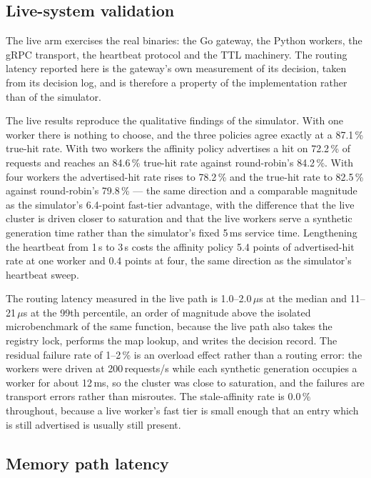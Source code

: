 \documentclass[10pt,twocolumn]{article}
\begin{document}
\subsection{Live-system validation}



The live arm exercises the real binaries: the Go gateway, the Python workers,
the gRPC transport, the heartbeat protocol and the TTL machinery. The routing
latency reported here is the gateway's own measurement of its decision, taken
from its decision log, and is therefore a property of the implementation
rather than of the simulator.

The live results reproduce the qualitative findings of the simulator. With one
worker there is nothing to choose, and the three policies agree exactly at a
87.1\,\% true-hit rate. With two workers the affinity policy advertises a hit
on 72.2\,\% of requests and reaches an 84.6\,\% true-hit rate against
round-robin's 84.2\,\%. With four workers the advertised-hit rate rises to
78.2\,\% and the true-hit rate to 82.5\,\% against round-robin's 79.8\,\% ---
the same direction and a comparable magnitude as the simulator's 6.4-point
fast-tier advantage, with the difference that the live cluster is driven
closer to saturation and that the live workers serve a synthetic generation
time rather than the simulator's fixed 5\,ms service time.
Lengthening the heartbeat from 1\,s to 3\,s costs the affinity policy 5.4
points of advertised-hit rate at one worker and 0.4 points at four, the same
direction as the simulator's heartbeat sweep.

The routing latency measured in the live path is 1.0--2.0\,$\mu$s at the
median and 11--21\,$\mu$s at the 99th percentile, an order of magnitude above
the isolated microbenchmark of the same function, because the live path also
takes the registry lock, performs the map lookup, and writes the decision
record. The residual failure rate of 1--2\,\% is an overload effect rather
than a routing error: the workers were driven at 200\,requests/s while each
synthetic generation occupies a worker for about 12\,ms, so the cluster was
close to saturation, and the failures are transport errors rather than
misroutes. The stale-affinity rate is 0.0\,\% throughout, because a live
worker's fast tier is small enough that an entry which is still advertised is
usually still present.

\subsection{Memory path latency}
\end{document}
